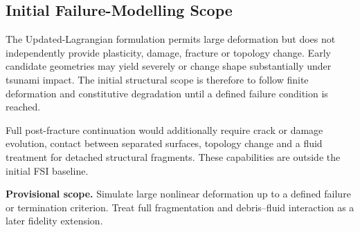 
\subsection{Initial Failure-Modelling Scope}
\label{subsec:res_str_dmg_initial_failure_scope}

The Updated-Lagrangian formulation permits large deformation but does not independently provide plasticity, damage, fracture or topology change. Early candidate geometries may yield severely or change shape substantially under tsunami impact. The initial structural scope is therefore to follow finite deformation and constitutive degradation until a defined failure condition is reached.

Full post-fracture continuation would additionally require crack or damage evolution, contact between separated surfaces, topology change and a fluid treatment for detached structural fragments. These capabilities are outside the initial FSI baseline.

\textbf{Provisional scope.} Simulate large nonlinear deformation up to a defined failure or termination criterion. Treat full fragmentation and debris--fluid interaction as a later fidelity extension.
